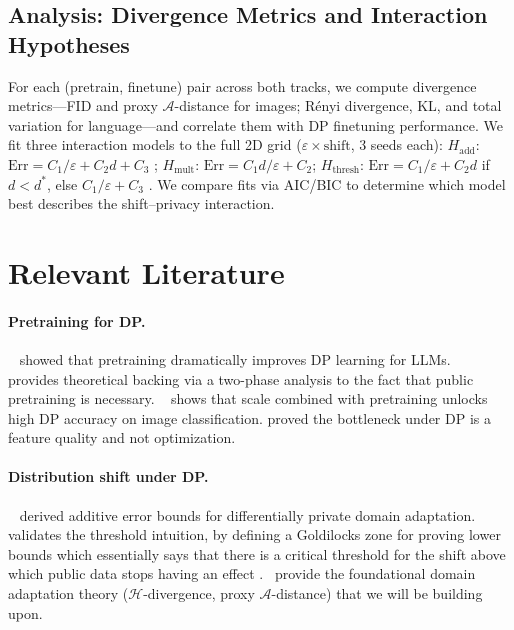 \documentclass{article}
\begin{document}
\subsection{Analysis: Divergence Metrics and Interaction Hypotheses}

For each (pretrain, finetune) pair across both tracks, we compute divergence metrics---FID and proxy $\mathcal{A}$-distance for images; R\'{e}nyi divergence, KL, and total variation for language---and correlate them with DP finetuning performance. We fit three interaction models to the full 2D grid ($\varepsilon \times \text{shift}$, 3 seeds each):
$H_{\text{add}}$: $\text{Err} = C_1/\varepsilon + C_2 d + C_3$ \cite{bassily2023dp};\;
$H_{\text{mult}}$: $\text{Err} = C_1 d/\varepsilon + C_2$;\;
$H_{\text{thresh}}$: $\text{Err} = C_1/\varepsilon + C_2 d$ if $d < d^*$, else $C_1/\varepsilon + C_3$ \cite{setlur2025lower}.
We compare fits via AIC/BIC to determine which model best describes the shift--privacy interaction.

\section{Relevant Literature}

\paragraph{Pretraining for DP.}
~\cite{li2022large} showed that pretraining dramatically improves DP learning for LLMs. ~\cite{ganesh2023why} provides theoretical backing via a two-phase analysis to the fact that public pretraining is necessary. ~\cite{de2022unlocking} shows that scale combined with pretraining unlocks high DP accuracy on image classification. \cite{tramer2021differentially} proved the bottleneck under DP is a feature quality and not optimization.

\paragraph{Distribution shift under DP.}
~\cite{bassily2023dp} derived additive error bounds for differentially private domain adaptation. ~\cite{setlur2025lower} validates the threshold intuition, by defining a Goldilocks zone for proving lower bounds which essentially says that there is a critical threshold for the shift above which public data stops having an effect .~\cite{bendavid2010theory} provide the foundational domain adaptation theory ($\mathcal{H}$-divergence, proxy $\mathcal{A}$-distance) that we will be building upon.
\end{document}
